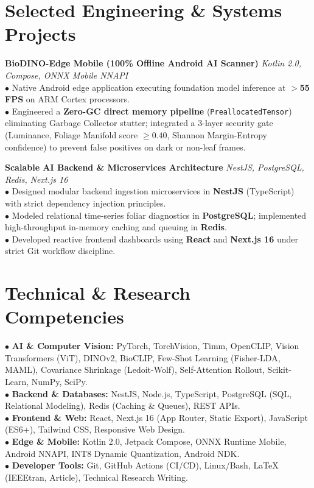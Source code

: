 \documentclass[10pt,a4paper]{article}
\begin{document}
\section{Selected Engineering \& Systems Projects}
\textbf{BioDINO-Edge Mobile (100\% Offline Android AI Scanner)} \hfill \textit{Kotlin 2.0, Compose, ONNX Mobile NNAPI}\\
$\bullet$ Native Android edge application executing foundation model inference at \textbf{$>$55 FPS} on ARM Cortex processors.\\
$\bullet$ Engineered a \textbf{Zero-GC direct memory pipeline} (\texttt{PreallocatedTensor}) eliminating Garbage Collector stutter; integrated a 3-layer security gate (Luminance, Foliage Manifold score $\ge 0.40$, Shannon Margin-Entropy confidence) to prevent false positives on dark or non-leaf frames.

\vspace{3pt}
\textbf{Scalable AI Backend \& Microservices Architecture} \hfill \textit{NestJS, PostgreSQL, Redis, Next.js 16}\\
$\bullet$ Designed modular backend ingestion microservices in \textbf{NestJS} (TypeScript) with strict dependency injection principles.\\
$\bullet$ Modeled relational time-series foliar diagnostics in \textbf{PostgreSQL}; implemented high-throughput in-memory caching and queuing in \textbf{Redis}.\\
$\bullet$ Developed reactive frontend dashboards using \textbf{React} and \textbf{Next.js 16} under strict Git workflow discipline.

\section{Technical \& Research Competencies}
$\bullet$ \textbf{AI \& Computer Vision:} PyTorch, TorchVision, Timm, OpenCLIP, Vision Transformers (ViT), DINOv2, BioCLIP, Few-Shot Learning (Fisher-LDA, MAML), Covariance Shrinkage (Ledoit-Wolf), Self-Attention Rollout, Scikit-Learn, NumPy, SciPy.\\
$\bullet$ \textbf{Backend \& Databases:} NestJS, Node.js, TypeScript, PostgreSQL (SQL, Relational Modeling), Redis (Caching \& Queues), REST APIs.\\
$\bullet$ \textbf{Frontend \& Web:} React, Next.js 16 (App Router, Static Export), JavaScript (ES6+), Tailwind CSS, Responsive Web Design.\\
$\bullet$ \textbf{Edge \& Mobile:} Kotlin 2.0, Jetpack Compose, ONNX Runtime Mobile, Android NNAPI, INT8 Dynamic Quantization, Android NDK.\\
$\bullet$ \textbf{Developer Tools:} Git, GitHub Actions (CI/CD), Linux/Bash, \LaTeX{} (IEEEtran, Article), Technical Research Writing.
\end{document}
